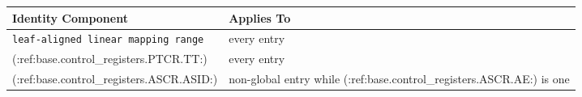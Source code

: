 \Needspace{1.25in}
\begingroup\footnotesize
\setlength{\aboverulesep}{0pt}
\setlength{\belowrulesep}{0pt}
\setlength{\extrarowheight}{1.2pt}
\begin{center}
\begin{tabularx}{\linewidth}{@{}>{\raggedright\arraybackslash}p{2.00in}>{\raggedright\arraybackslash}X@{}}
\toprule
\rowcolor{BedrockHeaderFill}
\textbf{Identity Component} & \textbf{Applies To}\\
\midrule
\texttt{leaf-aligned linear mapping range} & every entry\\
(:ref:base.control_registers.PTCR.TT:) & every entry\\
(:ref:base.control_registers.ASCR.ASID:) & non-global entry while (:ref:base.control_registers.ASCR.AE:) is one\\
\bottomrule
\end{tabularx}
\end{center}
\endgroup



